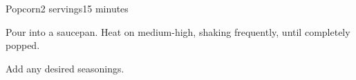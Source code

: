 \documentclass[../Cookbook.tex]{subfiles}
\begin{document}
\begin{recipe}[Popcorn]{Popcorn}{2 servings}{15 minutes}

Pour into a saucepan. Heat on medium-high, shaking frequently, until completely popped.

Add any desired seasonings.

\end{recipe}
\end{document}
